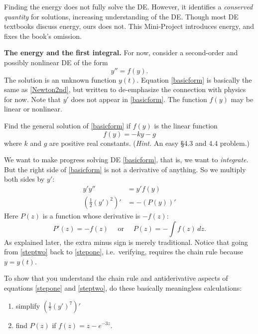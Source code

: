 \documentclass[12pt]{article}
\theoremstyle{definition}
\begin{document}
Finding the energy does not fully solve the DE.  However, it identifies a \emph{conserved quantity} for solutions, increasing understanding of the DE.  Though most DE textbooks discuss energy, ours does not.  This Mini-Project introduces energy, and fixes the book's omission.

\medskip
\textbf{The energy and the first integral.}  For now, consider a second-order and possibly nonlinear DE of the form
\begin{equation}
y'' = f(y). \label{basicform}
\end{equation}
The solution is an unknown function $y(t)$.  Equation \eqref{basicform} is basically the same as \eqref{Newton2nd}, but written to de-emphasize the connection with physics for now.  Note that $y'$ does not appear in \eqref{basicform}.  The function $f(y)$ may be linear or nonlinear.

\begin{exerpart}
Find the general solution of \eqref{basicform} if $f(y)$ is the linear function
    $$f(y) = -ky - g$$
where $k$ and $g$ are positive real constants.  (\emph{Hint.}  An easy \S 4.3 and 4.4 problem.)
\end{exerpart}

We want to make progress solving DE \eqref{basicform}, that is, we want to \emph{integrate}.  But the right side of \eqref{basicform} is not a derivative of anything.  So we multiply both sides by $y'$:
\begin{align}
y' y'' &= y' f(y) \label{stepone} \\
\left(\frac{1}{2} (y')^2\right)' &= - \left(P(y)\right)'  \label{steptwo}
\end{align}
Here $P(z)$ is a function whose derivative is $-f(z)$:
    $$P'(z)=-f(z) \quad \text{ or } \quad P(z) = -\int f(z)\,dz.$$
As explained later, the extra minus sign is merely traditional.  Notice that going from \eqref{steptwo} back to \eqref{stepone}, i.e.~verifying, requires the chain rule because $y=y(t)$.

\begin{exerpart}
To show that you understand the chain rule and antiderivative aspects of equations \eqref{stepone} and \eqref{steptwo}, do these basically meaningless calculations:
\renewcommand{\labelenumi}{\roman{enumi})}
\begin{enumerate}
\item simplify $\left(\frac{1}{7} (y')^7\right)'$
\item find $P(z)$ if $f(z)=z-e^{-3 z}$.
\end{enumerate}
\end{exerpart}
\end{document}
